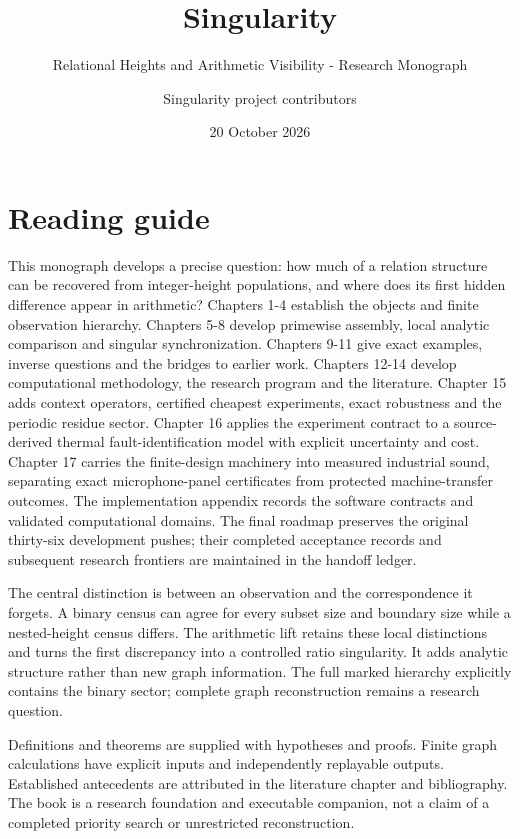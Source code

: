 \documentclass[
  11pt,
  a4paper,
]{report}
\title{Singularity}
\subtitle{Relational Heights and Arithmetic Visibility - Research
Monograph}
\author{Singularity project contributors}
\date{20 October 2026}
\begin{document}
\maketitle

{
\setcounter{tocdepth}{1}
\tableofcontents
}
\hypertarget{reading-guide}{%
\chapter*{Reading guide}\label{reading-guide}}

This monograph develops a precise question: how much of a relation
structure can be recovered from integer-height populations, and where
does its first hidden difference appear in arithmetic? Chapters 1-4
establish the objects and finite observation hierarchy. Chapters 5-8
develop primewise assembly, local analytic comparison and singular
synchronization. Chapters 9-11 give exact examples, inverse questions
and the bridges to earlier work. Chapters 12-14 develop computational
methodology, the research program and the literature. Chapter 15 adds
context operators, certified cheapest experiments, exact robustness and
the periodic residue sector. Chapter 16 applies the experiment contract
to a source-derived thermal fault-identification model with explicit
uncertainty and cost. Chapter 17 carries the finite-design machinery
into measured industrial sound, separating exact microphone-panel
certificates from protected machine-transfer outcomes. The
implementation appendix records the software contracts and validated
computational domains. The final roadmap preserves the original
thirty-six development pushes; their completed acceptance records and
subsequent research frontiers are maintained in the handoff ledger.

The central distinction is between an observation and the correspondence
it forgets. A binary census can agree for every subset size and boundary
size while a nested-height census differs. The arithmetic lift retains
these local distinctions and turns the first discrepancy into a
controlled ratio singularity. It adds analytic structure rather than new
graph information. The full marked hierarchy explicitly contains the
binary sector; complete graph reconstruction remains a research
question.

Definitions and theorems are supplied with hypotheses and proofs. Finite
graph calculations have explicit inputs and independently replayable
outputs. Established antecedents are attributed in the literature
chapter and bibliography. The book is a research foundation and
executable companion, not a claim of a completed priority search or
unrestricted reconstruction.
\end{document}
